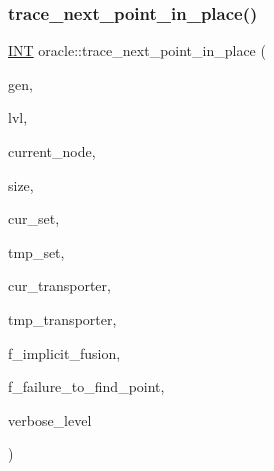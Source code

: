 \subsubsection{\texorpdfstring{trace\+\_\+next\+\_\+point\+\_\+in\+\_\+place()}{trace\_next\_point\_in\_place()}}
{\footnotesize\ttfamily \mbox{\hyperlink{galois_8h_a09fddde158a3a20bd2dcadb609de11dc}{I\+NT}} oracle\+::trace\+\_\+next\+\_\+point\+\_\+in\+\_\+place (\begin{DoxyParamCaption}\item[{\mbox{\hyperlink{classgenerator}{generator}} $\ast$}]{gen,  }\item[{\mbox{\hyperlink{galois_8h_a09fddde158a3a20bd2dcadb609de11dc}{I\+NT}}}]{lvl,  }\item[{\mbox{\hyperlink{galois_8h_a09fddde158a3a20bd2dcadb609de11dc}{I\+NT}}}]{current\+\_\+node,  }\item[{\mbox{\hyperlink{galois_8h_a09fddde158a3a20bd2dcadb609de11dc}{I\+NT}}}]{size,  }\item[{\mbox{\hyperlink{galois_8h_a09fddde158a3a20bd2dcadb609de11dc}{I\+NT}} $\ast$}]{cur\+\_\+set,  }\item[{\mbox{\hyperlink{galois_8h_a09fddde158a3a20bd2dcadb609de11dc}{I\+NT}} $\ast$}]{tmp\+\_\+set,  }\item[{\mbox{\hyperlink{galois_8h_a09fddde158a3a20bd2dcadb609de11dc}{I\+NT}} $\ast$}]{cur\+\_\+transporter,  }\item[{\mbox{\hyperlink{galois_8h_a09fddde158a3a20bd2dcadb609de11dc}{I\+NT}} $\ast$}]{tmp\+\_\+transporter,  }\item[{\mbox{\hyperlink{galois_8h_a09fddde158a3a20bd2dcadb609de11dc}{I\+NT}}}]{f\+\_\+implicit\+\_\+fusion,  }\item[{\mbox{\hyperlink{galois_8h_a09fddde158a3a20bd2dcadb609de11dc}{I\+NT}} \&}]{f\+\_\+failure\+\_\+to\+\_\+find\+\_\+point,  }\item[{\mbox{\hyperlink{galois_8h_a09fddde158a3a20bd2dcadb609de11dc}{I\+NT}}}]{verbose\+\_\+level }\end{DoxyParamCaption})}

\mbox{\label{classoracle_a33e1e9e4dde6fbecd7ae858576a7132f}} 

